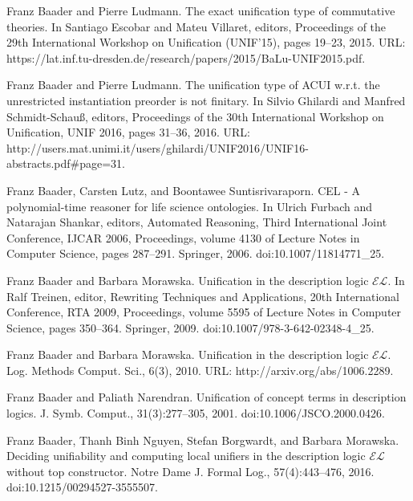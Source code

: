\par\noindent  [9]  Franz Baader and Pierre Ludmann.  The exact unification type of commutative theories.  In Santiago Escobar and Mateu Villaret, editors, Proceedings of the 29th International Workshop on Unification (UNIF’15), pages 19–23, 2015.  URL: https://lat.inf.tu-dresden.de/research/papers/2015/BaLu-UNIF2015.pdf.  
 
\par\noindent  [10]  Franz Baader and Pierre Ludmann.  The unification type of ACUI w.r.t. the unrestricted instantiation preorder is not finitary.  In Silvio Ghilardi and Manfred Schmidt-Schauß, editors, Proceedings of the 30th International Workshop on Unification, UNIF 2016, pages 31–36, 2016.  URL: http://users.mat.unimi.it/users/ghilardi/UNIF2016/UNIF16-abstracts.pdf\#page=31.  
 
\par\noindent  [11]  Franz Baader, Carsten Lutz, and Boontawee Suntisrivaraporn.  CEL - A polynomial-time reasoner for life science ontologies.  In Ulrich Furbach and Natarajan Shankar, editors, Automated Reasoning, Third International Joint Conference, IJCAR 2006, Proceedings, volume 4130 of Lecture Notes in Computer Science, pages 287–291. Springer, 2006.  doi:10.1007/11814771\_25.  
 
\par\noindent  [12]  Franz Baader and Barbara Morawska.  Unification in the description logic $\mathcal{EL}$.  In Ralf Treinen, editor, Rewriting Techniques and Applications, 20th International Conference, RTA 2009, Proceedings, volume 5595 of Lecture Notes in Computer Science, pages 350–364. Springer, 2009.  doi:10.1007/978-3-642-02348-4\_25.  
 
\par\noindent  [13]  Franz Baader and Barbara Morawska.  Unification in the description logic $\mathcal{EL}$.  Log. Methods Comput. Sci., 6(3), 2010.  URL: http://arxiv.org/abs/1006.2289.  
 
\par\noindent  [14]  Franz Baader and Paliath Narendran.  Unification of concept terms in description logics.  J. Symb. Comput., 31(3):277–305, 2001.  doi:10.1006/JSCO.2000.0426.  
 
\par\noindent  [15]  Franz Baader, Thanh Binh Nguyen, Stefan Borgwardt, and Barbara Morawska.  Deciding unifiability and computing local unifiers in the description logic $\mathcal{EL}$ without top constructor.  Notre Dame J. Formal Log., 57(4):443–476, 2016.  doi:10.1215/00294527-3555507.  
 
